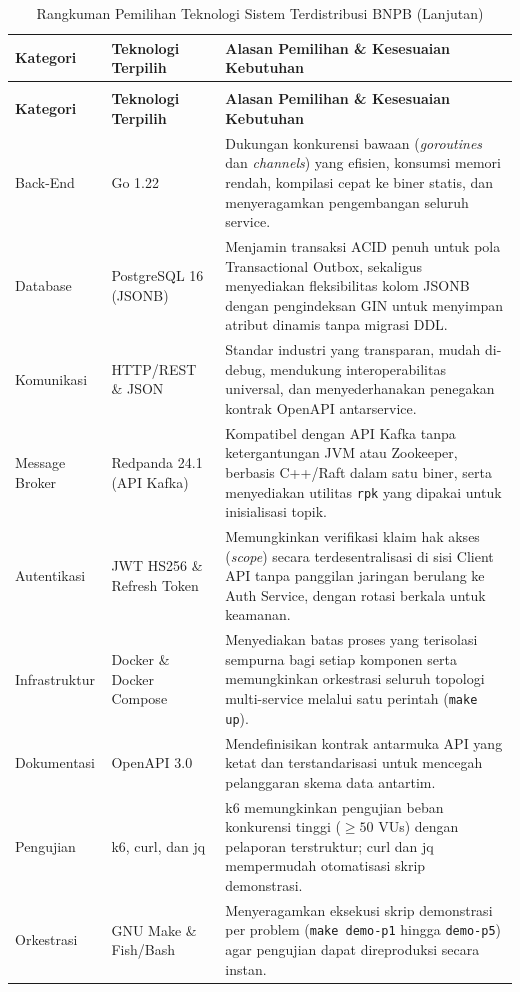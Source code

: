 \begin{singlespacing}
\begin{footnotesize}
\begin{xltabular}{\textwidth}{l p{4.9cm} X}
\caption{Rangkuman Pemilihan Teknologi Sistem Terdistribusi BNPB} \label{tab:teknologi} \\
\toprule
\textbf{Kategori} & \textbf{Teknologi Terpilih} & \textbf{Alasan Pemilihan \& Kesesuaian Kebutuhan} \\
\midrule
\endfirsthead
\caption[]{Rangkuman Pemilihan Teknologi Sistem Terdistribusi BNPB (Lanjutan)} \\
\toprule
\textbf{Kategori} & \textbf{Teknologi Terpilih} & \textbf{Alasan Pemilihan \& Kesesuaian Kebutuhan} \\
\midrule
\endhead
\bottomrule
\endfoot
Back-End & Go 1.22 & Dukungan konkurensi bawaan (\textit{goroutines} dan \textit{channels}) yang efisien, konsumsi memori rendah, kompilasi cepat ke biner statis, dan menyeragamkan pengembangan seluruh service. \\
\addlinespace[2pt]
Database & PostgreSQL 16 (JSONB) & Menjamin transaksi ACID penuh untuk pola Transactional Outbox, sekaligus menyediakan fleksibilitas kolom JSONB dengan pengindeksan GIN untuk menyimpan atribut dinamis tanpa migrasi DDL. \\
\addlinespace[2pt]
Komunikasi & HTTP/REST \& JSON & Standar industri yang transparan, mudah di-debug, mendukung interoperabilitas universal, dan menyederhanakan penegakan kontrak OpenAPI antarservice. \\
\addlinespace[2pt]
Message Broker & Redpanda 24.1 (API Kafka) & Kompatibel dengan API Kafka tanpa ketergantungan JVM atau Zookeeper, berbasis C++/Raft dalam satu biner, serta menyediakan utilitas \texttt{rpk} yang dipakai untuk inisialisasi topik. \\
\addlinespace[2pt]
Autentikasi & JWT HS256 \& Refresh Token & Memungkinkan verifikasi klaim hak akses (\textit{scope}) secara terdesentralisasi di sisi Client API tanpa panggilan jaringan berulang ke Auth Service, dengan rotasi berkala untuk keamanan. \\
\addlinespace[2pt]
Infrastruktur & Docker \& Docker Compose & Menyediakan batas proses yang terisolasi sempurna bagi setiap komponen serta memungkinkan orkestrasi seluruh topologi multi-service melalui satu perintah (\texttt{make up}). \\
\addlinespace[2pt]
Dokumentasi & OpenAPI 3.0 & Mendefinisikan kontrak antarmuka API yang ketat dan terstandarisasi untuk mencegah pelanggaran skema data antartim. \\
\addlinespace[2pt]
Pengujian & k6, curl, dan jq & k6 memungkinkan pengujian beban konkurensi tinggi ($\ge 50$ VUs) dengan pelaporan terstruktur; curl dan jq mempermudah otomatisasi skrip demonstrasi. \\
\addlinespace[2pt]
Orkestrasi & GNU Make \& Fish/Bash & Menyeragamkan eksekusi skrip demonstrasi per problem (\texttt{make demo-p1} hingga \texttt{demo-p5}) agar pengujian dapat direproduksi secara instan. \\
\end{xltabular}
\end{footnotesize}
\end{singlespacing}
